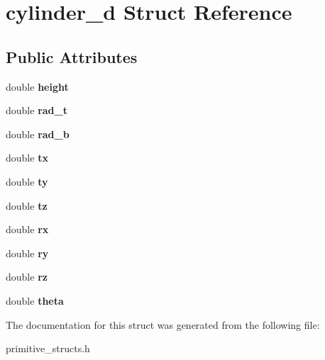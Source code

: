 \hypertarget{structcylinder__d}{}\section{cylinder\+\_\+d Struct Reference}
\label{structcylinder__d}
\subsection*{Public Attributes}
\begin{DoxyCompactItemize}
\item 
double {\bfseries height}\hypertarget{structcylinder__d_ab60bd3291f5367c507c00d2222f22dd9}{}\label{structcylinder__d_ab60bd3291f5367c507c00d2222f22dd9}

\item 
double {\bfseries rad\+\_\+t}\hypertarget{structcylinder__d_a3b77c182fb989c96adc349b78e1c1359}{}\label{structcylinder__d_a3b77c182fb989c96adc349b78e1c1359}

\item 
double {\bfseries rad\+\_\+b}\hypertarget{structcylinder__d_a29f0f504368f7a83204e5504987e1d05}{}\label{structcylinder__d_a29f0f504368f7a83204e5504987e1d05}

\item 
double {\bfseries tx}\hypertarget{structcylinder__d_a69b02fac6ddb283f29ddf7a0269bb7d9}{}\label{structcylinder__d_a69b02fac6ddb283f29ddf7a0269bb7d9}

\item 
double {\bfseries ty}\hypertarget{structcylinder__d_aa8aa6459091b34354289e93830dc8bf9}{}\label{structcylinder__d_aa8aa6459091b34354289e93830dc8bf9}

\item 
double {\bfseries tz}\hypertarget{structcylinder__d_ad5427a34dec46e970a25444dfe94288a}{}\label{structcylinder__d_ad5427a34dec46e970a25444dfe94288a}

\item 
double {\bfseries rx}\hypertarget{structcylinder__d_a6d00b134c72620b1834a4dafd007a9d4}{}\label{structcylinder__d_a6d00b134c72620b1834a4dafd007a9d4}

\item 
double {\bfseries ry}\hypertarget{structcylinder__d_aa2610e2b882d4b8c48dda61033710516}{}\label{structcylinder__d_aa2610e2b882d4b8c48dda61033710516}

\item 
double {\bfseries rz}\hypertarget{structcylinder__d_a5472f4de0e74590f9ac218cda2fbbd52}{}\label{structcylinder__d_a5472f4de0e74590f9ac218cda2fbbd52}

\item 
double {\bfseries theta}\hypertarget{structcylinder__d_a893fa2a8e9f74e485126a18f97f16166}{}\label{structcylinder__d_a893fa2a8e9f74e485126a18f97f16166}

\end{DoxyCompactItemize}


The documentation for this struct was generated from the following file\+:\begin{DoxyCompactItemize}
\item 
primitive\+\_\+structs.\+h\end{DoxyCompactItemize}

